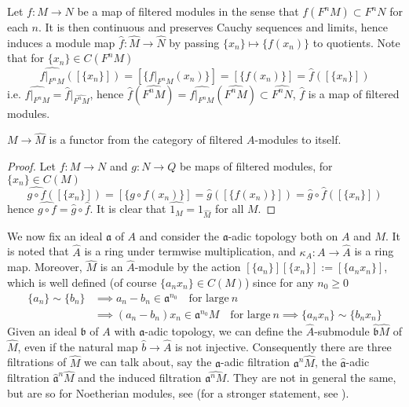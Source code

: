 \documentclass[10pt]{extarticle}
\begin{document}
Let $f\colon M\to N$ be a map of filtered modules in the sense that $f(F^nM)\subset F^nN$ for each $n$. It is then continuous and preserves Cauchy sequences and limits, hence induces a module map $\widehat{f}\colon \widehat{M}\to\widehat{N}$ by passing $\{x_n\}\mapsto\{f(x_n)\}$ to quotients. Note that for $\{x_n\}\in C(F^nM)$
\[
\widehat{f|_{F^nM}}([\{x_n\}])=[\{f|_{F^nM}(x_n)\}]=[\{f(x_n)\}]=\widehat{f}([\{x_n\}])
\]
i.e. $\widehat{f|_{F^nM}}=\widehat{f}|_{\widehat{F^nM}}$, hence $\widehat{f}\left(\widehat{F^nM}\right)=\widehat{f|_{F^nM}}\left(\widehat{F^nM}\right)\subset\widehat{F^nN}$, $\widehat{f}$ is a map of filtered modules.

\begin{proposition}{}{}
    $M\to \widehat{M}$ is a functor from the category of filtered $A$-modules to itself.
\end{proposition}
\begin{proof}
    Let $f\colon M\to N$ and $g\colon N\to Q$ be maps of filtered modules, for $\{x_n\}\in C(M)$
    \[
    \widehat{g\circ f}([\{x_n\}])=[\{g\circ f(x_n)\}]=\widehat{g}([\{f(x_n)\}])=\widehat{g}\circ\widehat{f}([\{x_n\}])
    \]
    hence $\widehat{g\circ f}=\widehat{g}\circ\widehat{f}$. It is clear that $\widehat{1_M}=1_{\widehat{M}}$ for all $M$.
\end{proof}

We now fix an ideal $\mathfrak{a}$ of $A$ and consider the $\mathfrak{a}$-adic topology both on $A$ and $M$. It is noted that $\widehat{A}$ is a ring under termwise multiplication, and $\kappa_A\colon A\to \widehat{A}$ is a ring map. Moreover, $\widehat{M}$ is an $\widehat{A}$-module by the action $[\{a_n\}][\{x_n\}]:=[\{a_nx_n\}]$, which is well defined (of course $\{a_nx_n\}\in C(M)$) since for any $n_0\geq 0$
\begin{align*}
    \{a_n\}\sim\{b_n\}&\implies a_n-b_n\in \mathfrak{a}^{n_0}\quad \text{for large}\ n\\
    &\implies (a_n-b_n)x_n\in \mathfrak{a}^{n_0}M\quad\text{for large}\ n\implies \{a_nx_n\}\sim\{b_nx_n\}
\end{align*}
Given an ideal $\mathfrak{b}$ of $A$ with $\mathfrak{a}$-adic topology, we can define the $\widehat{A}$-submodule $\widehat{\mathfrak{b}}\widehat{M}$ of $\widehat{M}$, even if the natural map $\widehat{b}\to\widehat{A}$ is not injective. Consequently there are three filtrations of $\widehat{M}$ we can talk about, say the $\mathfrak{a}$-adic filtration $\mathfrak{a}^n\widehat{M}$, the $\widehat{\mathfrak{a}}$-adic filtration $\widehat{\mathfrak
{a}}^n\widehat{M}$ and the induced filtration $\widehat{\mathfrak{a}^nM}$. They are not in general the same, but are so for Noetherian modules, see  (for a stronger statement, see \cite[Corollary~(22.21).]{altman2013term}).
\end{document}
